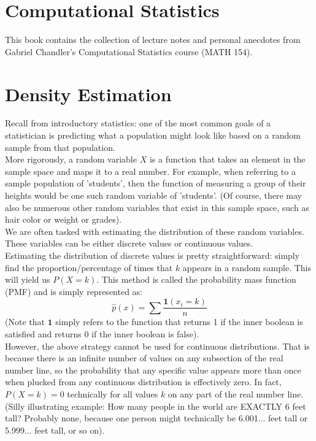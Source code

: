 \documentclass[12pt]{article}
\begin{document}
\section*{Computational Statistics}
This book contains the collection of lecture notes and personal anecdotes from Gabriel Chandler's Computational Statistics course (MATH 154). 
\section{Density Estimation}
Recall from introductory statistics: one of the most common goals of a statistician is predicting what a population might look like based on a random sample from that population. \\

More rigorously, a random variable $X$ is a function that takes an element in the sample space and maps it to a real number. For example, when referring to a sample population of 'students', then the function of measuring a group of their heights would be one such random variable of 'students'. (Of course, there may also be numerous other random variables that exist in this sample space, such as hair color or weight or grades). \\

We are often tasked with estimating the distribution of these random variables. These variables can be either discrete values or continuous values. \\

Estimating the distribution of discrete values is pretty straightforward: simply find the proportion/percentage of times that $k$ appears in a random sample. This will yield us $P(X = k)$. This method is called the probability mass function (PMF) and is simply represented as: 
$$\hat{p}(x) = \sum \frac{\mathbf{1}(x_i = k)}{n}$$ 
(Note that $\mathbf{1}$ simply refers to the function that returns 1 if the inner boolean is satisfied and returns 0 if the inner boolean is false). \\

However, the above strategy cannot be used for continuous distributions. That is because there is an infinite number of values on any subsection of the real number line, so the probability that any specific value appears more than once when plucked from any continuous distribution is effectively zero. In fact, $P(X = k) = 0$ technically for all values $k$ on any part of the real number line. (Silly illustrating example: How many people in the world are EXACTLY 6 feet tall? Probably none, because one person might technically be 6.001... feet tall or 5.999... feet tall, or so on). \\
\end{document}
